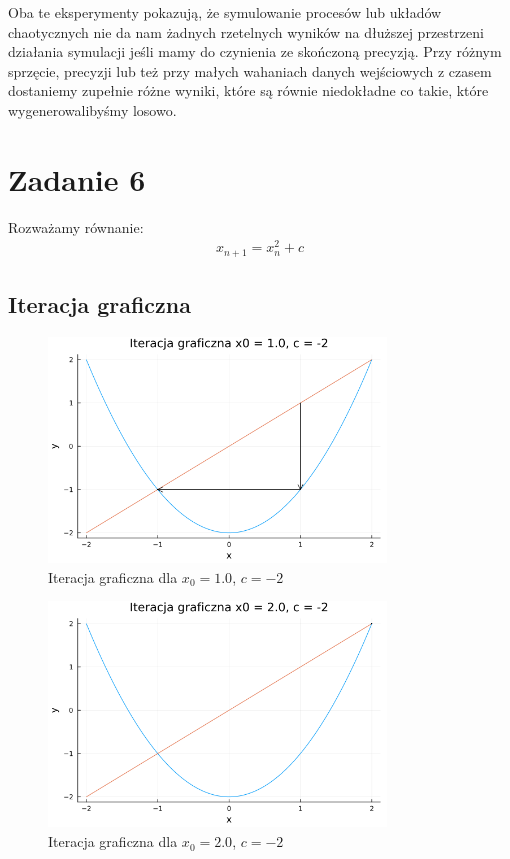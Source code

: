 \documentclass{article}
\begin{document}
Oba te eksperymenty pokazują, że symulowanie procesów
lub układów chaotycznych nie da nam żadnych rzetelnych
wyników na dłuższej przestrzeni działania symulacji
jeśli mamy do czynienia ze skończoną precyzją.
Przy różnym sprzęcie, precyzji
lub też przy małych wahaniach danych wejściowych
z czasem dostaniemy zupełnie różne wyniki, które są równie niedokładne
co takie, które wygenerowalibyśmy losowo.



\section*{Zadanie 6}
Rozważamy równanie:
\begin{gather*}
  x_{n+1}=x_n^2+c
\end{gather*}

\subsection*{Iteracja graficzna}
\begin{figure}[H]
  \centering
  \includegraphics[width=0.8\textwidth]{../images/ex6_1.png}
  \caption{Iteracja graficzna dla $x_0=1.0$, $c=-2$}
\end{figure}
\begin{figure}[H]
  \centering
  \includegraphics[width=0.8\textwidth]{../images/ex6_2.png}
  \caption{Iteracja graficzna dla $x_0=2.0$, $c=-2$}
\end{figure}
\end{document}
